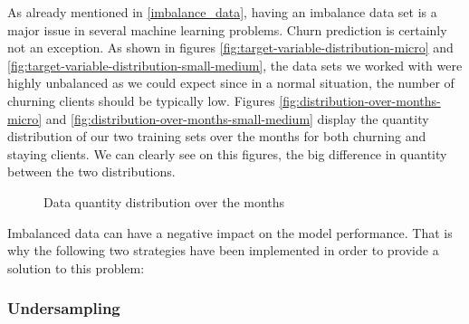 \documentclass[LaM,binding=0.6cm, english]{sapthesis}
\begin{document}
As already mentioned in \ref{imbalance_data}, having an imbalance data set is a major issue in several machine learning problems. Churn prediction is certainly not an exception. As shown in figures \ref{fig:target-variable-distribution-micro} and \ref{fig:target-variable-distribution-small-medium}, the data sets we worked with were highly unbalanced as we could expect since in a normal situation, the number of churning clients should be typically low. Figures \ref{fig:distribution-over-months-micro} and \ref{fig:distribution-over-months-small-medium} display the quantity distribution of our two training sets over the months for both churning and staying clients. We can clearly see on this figures, the big difference in quantity between the two distributions.

\begin{figure}[!ht]
  \centering
  \hfill
  \caption{Data quantity distribution over the months}
\end{figure}

Imbalanced data can have a negative impact on the model performance. That is why the following two strategies have been implemented in order to provide a solution to this problem:

\subsubsection{Undersampling}
\end{document}

